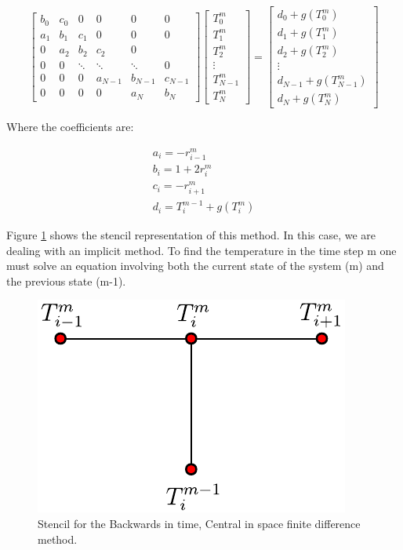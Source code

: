 $$
\begin{bmatrix}
         b_0 & c_0 & 0 & 0 & 0 & 0 \\
         a_1 & b_1 & c_1 & 0 & 0 & 0 \\ 
         0 & a_2 & b_2 & c_2 & 0 \\ 
         0 & 0 & \ddots & \ddots & \ddots & 0 \\
         0 & 0 & 0 & a_{N-1} & b_{N-1} & c_{N-1} \\
         0 & 0 & 0 & 0 & a_N & b_N 
     \end{bmatrix}
\begin{bmatrix}
         T^m_0  \\
         T^m_1 \\ 
         T^m_2  \\ 
         \vdots \\
         T^m_{N-1} \\
         T^m_N 
     \end{bmatrix}
     =
     \begin{bmatrix}
         d_0 + g(T^m_0) \\
         d_1 + g(T^m_1)\\ 
         d_2 + g(T^m_2)\\ 
         \vdots\\ 
         d_{N-1} + g(T^m_{N-1})\\
         d_{N} + g(T^m_{N}) 
     \end{bmatrix}
$$

Where the coefficients are:

\begin{equation}
    \begin{gathered}
        a_i = -r^m_{i-1} \\
    b_i = 1 + 2r^m_{i}\\
    c_i = - r^m_{i+1} \\
    d_i = T^{m-1}_i + g(T_i^m)
    \end{gathered}
\end{equation}

Figure \ref{fig:StensilBTCS} shows the stencil representation of this method. In this case, we are dealing with an implicit method. To find the temperature in the time step m one must solve an equation involving both the current state of the system (m) and the previous state (m-1). 

\begin{figure}[h]
    \centering
    \includegraphics[width=0.35\columnwidth]{Stencils_FiniteDifferences/BTCS.pdf}
    \caption{Stencil for the Backwards in time, Central in space finite difference method.}
    \label{fig:StensilBTCS}
\end{figure}

